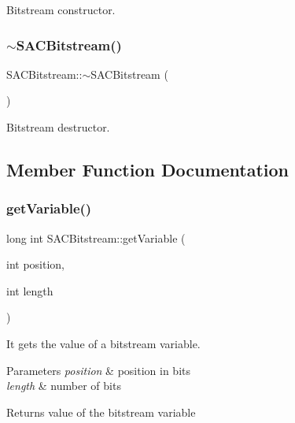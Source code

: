 Bitstream constructor. 

\mbox{\label{class_s_a_c_bitstream_a4a416e485fb3a14a7bafb0a5542d7945}} 
\subsubsection{$\sim$\+S\+A\+C\+Bitstream()}
{\footnotesize\ttfamily S\+A\+C\+Bitstream\+::$\sim$\+S\+A\+C\+Bitstream (\begin{DoxyParamCaption}{ }\end{DoxyParamCaption})}



Bitstream destructor. 



\subsection{Member Function Documentation}
\mbox{\label{class_s_a_c_bitstream_ad0f39852ca2853efa15be087ce68c3b9}} 
\subsubsection{get\+Variable()}
{\footnotesize\ttfamily long int S\+A\+C\+Bitstream\+::get\+Variable (\begin{DoxyParamCaption}\item[{int}]{position,  }\item[{int}]{length }\end{DoxyParamCaption})}



It gets the value of a bitstream variable. 


\begin{DoxyParams}{Parameters}
{\em position} & position in bits \\
\hline
{\em length} & number of bits \\
\hline
\end{DoxyParams}
\begin{DoxyReturn}{Returns}
value of the bitstream variable 
\end{DoxyReturn}
\mbox{\label{class_s_a_c_bitstream_a3113cb4df7e64416b156c4f1d9564a4e}} 
